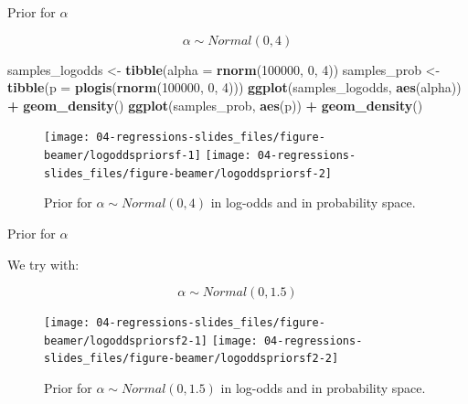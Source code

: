 \documentclass[12pt,ignorenonframetext,aspectratio=169]{beamer}
\newenvironment{Shaded}{\begin{snugshade}}{\end{snugshade}}
\newcommand{\DataTypeTok}[1]{\textcolor[rgb]{0.13,0.29,0.53}{#1}}
\newcommand{\DecValTok}[1]{\textcolor[rgb]{0.00,0.00,0.81}{#1}}
\newcommand{\KeywordTok}[1]{\textcolor[rgb]{0.13,0.29,0.53}{\textbf{#1}}}
\newcommand{\NormalTok}[1]{#1}
\newcommand{\OperatorTok}[1]{\textcolor[rgb]{0.81,0.36,0.00}{\textbf{#1}}}
\newcommand{\StringTok}[1]{\textcolor[rgb]{0.31,0.60,0.02}{#1}}
\begin{document}
\begin{frame}[fragile]{Prior for \(\alpha\)}
\protect\hypertarget{prior-for-alpha-1}{}

\begin{equation}
\alpha \sim Normal(0, 4) 
\end{equation}



\scriptsize

\begin{Shaded}
\begin{Highlighting}[]
\NormalTok{samples_logodds <-}\StringTok{ }\KeywordTok{tibble}\NormalTok{(}\DataTypeTok{alpha =} \KeywordTok{rnorm}\NormalTok{(}\DecValTok{100000}\NormalTok{, }\DecValTok{0}\NormalTok{, }\DecValTok{4}\NormalTok{))}
\NormalTok{samples_prob <-}\StringTok{ }\KeywordTok{tibble}\NormalTok{(}\DataTypeTok{p =} \KeywordTok{plogis}\NormalTok{(}\KeywordTok{rnorm}\NormalTok{(}\DecValTok{100000}\NormalTok{, }\DecValTok{0}\NormalTok{, }\DecValTok{4}\NormalTok{)))}
\KeywordTok{ggplot}\NormalTok{(samples_logodds, }\KeywordTok{aes}\NormalTok{(alpha)) }\OperatorTok{+}\StringTok{ }\KeywordTok{geom_density}\NormalTok{()}
\KeywordTok{ggplot}\NormalTok{(samples_prob, }\KeywordTok{aes}\NormalTok{(p)) }\OperatorTok{+}\StringTok{ }\KeywordTok{geom_density}\NormalTok{()}
\end{Highlighting}
\end{Shaded}

\begin{figure}
\texttt{[image: 04-regressions-slides\_files/figure-beamer/logoddspriorsf-1]} \texttt{[image: 04-regressions-slides\_files/figure-beamer/logoddspriorsf-2]} \caption{Prior for \(\alpha \sim Normal(0, 4)\) in log-odds and in probability space.}\label{fig:logoddspriorsf}
\end{figure}

\normalsize

\end{frame}

\begin{frame}{Prior for \(\alpha\)}
\protect\hypertarget{prior-for-alpha-2}{}

We try with:

\begin{equation}
\alpha \sim Normal(0, 1.5)
\end{equation}



\small

\begin{figure}
\texttt{[image: 04-regressions-slides\_files/figure-beamer/logoddspriorsf2-1]} \texttt{[image: 04-regressions-slides\_files/figure-beamer/logoddspriorsf2-2]} \caption{Prior for \(\alpha \sim Normal(0, 1.5)\) in log-odds and in probability space.}\label{fig:logoddspriorsf2}
\end{figure}

\normalsize

\end{frame}
\end{document}
